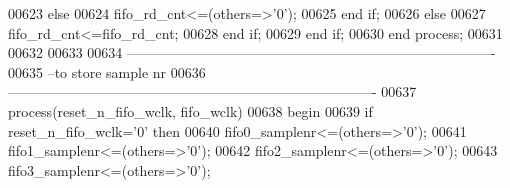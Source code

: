 \begin{DoxyCode}
00623               \textcolor{keywordflow}{else} 
00624                   \textcolor{vhdlchar}{fifo_rd_cnt}\textcolor{vhdlchar}{<=}\textcolor{vhdlchar}{(}\textcolor{keywordflow}{others}\textcolor{vhdlchar}{=}\textcolor{vhdlchar}{>}\textcolor{vhdlchar}{'}\textcolor{vhdllogic}{}\textcolor{vhdllogic}{0}\textcolor{vhdlchar}{'}\textcolor{vhdlchar}{)};
00625               \textcolor{keywordflow}{end} \textcolor{keywordflow}{if};
00626           \textcolor{keywordflow}{else} 
00627               \textcolor{vhdlchar}{fifo_rd_cnt}\textcolor{vhdlchar}{<=}\textcolor{vhdlchar}{fifo_rd_cnt};
00628           \textcolor{keywordflow}{end} \textcolor{keywordflow}{if};
00629         \textcolor{keywordflow}{end} \textcolor{keywordflow}{if};
00630     \textcolor{keywordflow}{end} \textcolor{keywordflow}{process};
00631     
00632     
00633     
00634 \textcolor{keyword}{-------------------------------------------------------------------------------    }
00635 \textcolor{keyword}{--to store sample nr}
00636 \textcolor{keyword}{-------------------------------------------------------------------------------}
00637   \textcolor{keywordflow}{process}(reset_n_fifo_wclk, fifo_wclk)
00638 \textcolor{vhdlkeyword}{    begin}
00639       \textcolor{keywordflow}{if} \textcolor{vhdlchar}{reset_n_fifo_wclk}\textcolor{vhdlchar}{=}\textcolor{vhdlchar}{'}\textcolor{vhdllogic}{}\textcolor{vhdllogic}{0}\textcolor{vhdlchar}{'} \textcolor{keywordflow}{then}
00640         \textcolor{vhdlchar}{fifo0_samplenr}\textcolor{vhdlchar}{<=}\textcolor{vhdlchar}{(}\textcolor{keywordflow}{others}\textcolor{vhdlchar}{=}\textcolor{vhdlchar}{>}\textcolor{vhdlchar}{'}\textcolor{vhdllogic}{}\textcolor{vhdllogic}{0}\textcolor{vhdlchar}{'}\textcolor{vhdlchar}{)};
00641         \textcolor{vhdlchar}{fifo1_samplenr}\textcolor{vhdlchar}{<=}\textcolor{vhdlchar}{(}\textcolor{keywordflow}{others}\textcolor{vhdlchar}{=}\textcolor{vhdlchar}{>}\textcolor{vhdlchar}{'}\textcolor{vhdllogic}{}\textcolor{vhdllogic}{0}\textcolor{vhdlchar}{'}\textcolor{vhdlchar}{)};
00642         \textcolor{vhdlchar}{fifo2_samplenr}\textcolor{vhdlchar}{<=}\textcolor{vhdlchar}{(}\textcolor{keywordflow}{others}\textcolor{vhdlchar}{=}\textcolor{vhdlchar}{>}\textcolor{vhdlchar}{'}\textcolor{vhdllogic}{}\textcolor{vhdllogic}{0}\textcolor{vhdlchar}{'}\textcolor{vhdlchar}{)};
00643           \textcolor{vhdlchar}{fifo3_samplenr}\textcolor{vhdlchar}{<=}\textcolor{vhdlchar}{(}\textcolor{keywordflow}{others}\textcolor{vhdlchar}{=}\textcolor{vhdlchar}{>}\textcolor{vhdlchar}{'}\textcolor{vhdllogic}{}\textcolor{vhdllogic}{0}\textcolor{vhdlchar}{'}\textcolor{vhdlchar}{)};

\end{DoxyCode}
